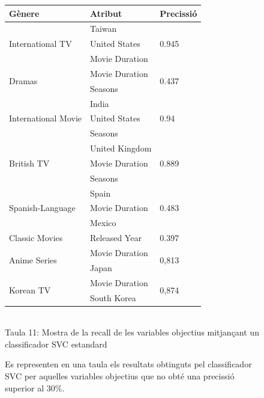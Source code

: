\documentclass[a4paper, 11pt]{article}
\begin{document}
\begin{figure}[h]
\begin{minipage}{5cm}
\begin{center}
\end{center}
\end{minipage} %
\hspace{2em}
\begin{minipage}{9cm} %
\begin{center}
    \begin{tabular}{l|l|l}
        \textbf{Gènere} & \textbf{Atribut} & \textbf{Precissió}\\\hline\hline
            \multirow{3}{*}{International TV} &  Taiwan & \multirow{3}{*}{0.945} \\
            & United States & \\
            & Movie Duration& \\ \hline
        \multirow{2}{*}{Dramas} &  Movie Duration & \multirow{2}{*}{0.437} \\
        & Seasons & \\\hline
        \multirow{3}{*}{International Movie} &  India & \multirow{3}{*}{0.94} \\
            & United States & \\
            & Seasons & \\ \hline
        \multirow{3}{*}{British TV} &  United Kingdom & \multirow{3}{*}{0.889} \\
            & Movie Duration & \\
            & Seasons & \\ \hline
        \multirow{3}{*}{Spanish-Language} &  Spain & \multirow{3}{*}{0.483} \\
            & Movie Duration & \\
            & Mexico & \\ \hline
        Classic Movies & Released Year & 0.397 \\ \hline 
        \multirow{2}{*}{Anime Series} & Movie Duration & \multirow{2}{*}{0,813}\\
        & Japan & \\ \hline
        \multirow{2}{*}{Korean TV} & Movie Duration & \multirow{2}{*}{0,874}\\
        & South Korea & \\ 
        
    \end{tabular}
    \label{tab:afins}
    \\
    Taula 11: Mostra de la recall de les variables objectius mitjançant un classificador SVC estandard   \setcounter{table}{11}
\end{center}
Es representen en una taula els resultats obtinguts pel classificador SVC per aquelles variables objectius que no obté una precissió superior al $30\%$.
\end{minipage} %
\end{figure} %
\end{document}
